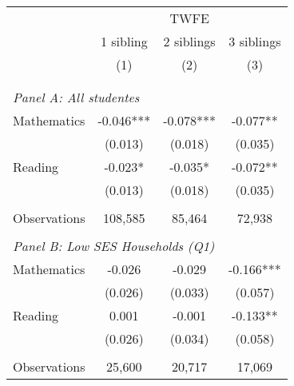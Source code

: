 \makeatletter
{}
{
\makeatother
\begin{tabular}{lccc}
\toprule
\cmidrule(lr){2-4}
& \multicolumn{3}{c}{TWFE} \\
\cmidrule(lr){2-4}
& 1 sibling & 2 siblings & 3 siblings  \\
\cmidrule(lr){2-2} \cmidrule(lr){3-3} \cmidrule(lr){4-4}
& (1) & (2) & (3)\\
\bottomrule
&  &  &  \\
&  &  &   \\
\multicolumn{4}{l}{\textit{Panel A: All studentes}} \\
\hspace{3mm}Mathematics&      -0.046***&      -0.078***&      -0.077** \\
                    &     (0.013)   &     (0.018)   &     (0.035)   \\
 
\hspace{3mm}Reading &      -0.023*  &      -0.035*  &      -0.072** \\
                    &     (0.013)   &     (0.018)   &     (0.035)   \\
                    &               &               &               \\
\hspace{3mm}Observations&     108,585   &      85,464   &      72,938   \\
 
&  &  &   \\
\multicolumn{4}{l}{\textit{Panel B: Low SES Households (Q1)}} \\
\hspace{3mm}Mathematics&      -0.026   &      -0.029   &      -0.166***\\
                    &     (0.026)   &     (0.033)   &     (0.057)   \\
 
\hspace{3mm}Reading &       0.001   &      -0.001   &      -0.133** \\
                    &     (0.026)   &     (0.034)   &     (0.058)   \\
                    &               &               &               \\
\hspace{3mm}Observations&      25,600   &      20,717   &      17,069   \\
 

\end{tabular}}

